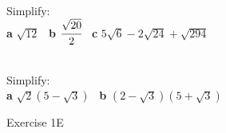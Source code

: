 \documentclass[fleqn]{article}
\begin{document}
\begin{examplebox}{}{}
	\\ %
	Simplify: \\
	\textbf{a}\hspace{2mm} $\sqrt{12}$							\hspace{15mm} \
	\textbf{b}\hspace{2mm} $\cfrac{\sqrt{20}}{2}$				\hspace{15mm} \
	\textbf{c}\hspace{2mm} $5\sqrt{6}-2\sqrt{24}+\sqrt{294}$		\hspace{15mm}
\end{examplebox}

\vspace{5cm}
\begin{examplebox}{}{}
	\\ %
	Simplify: \\
	\textbf{a}\hspace{2mm} $\sqrt{2}(5-\sqrt{3})$		\hspace{20mm} \
	\textbf{b}\hspace{2mm} $(2-\sqrt{3})(5+\sqrt{3})$	\hspace{20mm}
\end{examplebox}

\vfill
\begin{practice*}{Exercise 1E}{}
\end{practice*}
\newpage
\end{document}
